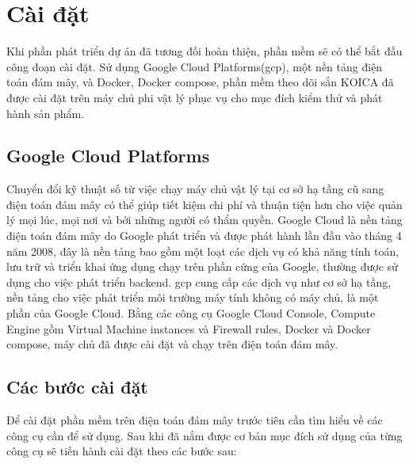 \documentclass[./../main.tex]{subfiles}
\begin{document}
\section{Cài đặt}
Khi phần phát triển dự án đã tương đối hoàn thiện, phần mềm sẽ có thể bắt đầu công đoạn cài đặt. Sử dụng Google Cloud Platforms(\acrshort{gcp}), một nền tảng điện toán đám mây, và Docker, Docker compose, phần mềm theo dõi sắn KOICA đã được cài đặt trên máy chủ phi vật lý phục vụ cho mục đích kiểm thử và phát hành sản phẩm.

\subsection{Google Cloud Platforms}
Chuyển đổi kỹ thuật số từ việc chạy máy chủ vật lý tại cơ sở hạ tầng cũ sang điện toán đám mây có thể giúp tiết kiệm chi phí và thuận tiện hơn cho việc quản lý mọi lúc, mọi nơi và bởi những người có thẩm quyền. Google Cloud là nền tảng điện toán đám mây do Google phát triển và được phát hành lần đầu vào tháng 4 năm 2008, đây là nền tảng bao gồm một loạt các dịch vụ có khả năng tính toán, lưu trữ và triển khai ứng dụng chạy trên phần cứng của Google, thường được sử dụng cho việc phát triển backend. \acrshort{gcp} cung cấp các dịch vụ như cơ sở hạ tầng, nền tảng cho việc phát triển môi trường máy tính không có máy chủ, là một phần của Google Cloud. Bằng các công cụ Google Cloud Console, Compute Engine gồm Virtual Machine instances và Firewall rules, Docker và Docker compose, máy chủ đã được cài đặt và chạy trên điện toán đám mây.

\subsection{Các bước cài đặt}
Để cài đặt phần mềm trên điện toán đám mây trước tiên cần tìm hiểu về các công cụ cần để sử dụng. Sau khi đã nắm được cơ bản mục đích sử dụng của từng công cụ sẽ tiến hành cài đặt theo các bước sau:
\end{document}
